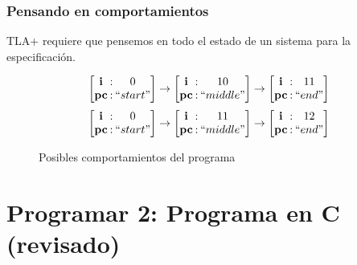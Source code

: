 \documentclass{beamer}
\begin{document}
\begin{frame}[fragile]
  \frametitle{Pensando en comportamientos}

  TLA+ requiere que pensemos en todo el estado de un sistema para la especificación.

  \begin{figure}
    \begin{center}
      \begin{equation*}
        \begingroup
        \setlength\arraycolsep{1pt}
        \begin{aligned}
          \begin{bmatrix*}
            \textbf{i} &:& 0 \\
            \textbf{pc}&:& ``start"
          \end{bmatrix*}
          \rightarrow
          \begin{bmatrix*}
            \textbf{i} &:& 10 \\
            \textbf{pc}&:& ``middle"
          \end{bmatrix*}
          \rightarrow
          \begin{bmatrix*}
            \textbf{i} &:& 11 \\
            \textbf{pc}&:& ``end"
          \end{bmatrix*}
        \end{aligned}
        \endgroup
      \end{equation*}
      \begin{equation*}
        \begingroup
        \setlength\arraycolsep{1pt}
        \begin{aligned}
          \begin{bmatrix*}
            \textbf{i} &:& 0 \\
            \textbf{pc}&:& ``start"
          \end{bmatrix*}
          \rightarrow
          \begin{bmatrix*}
            \textbf{i} &:& 11 \\
            \textbf{pc}&:& ``middle"
          \end{bmatrix*}
          \rightarrow
          \begin{bmatrix*}
            \textbf{i} &:& 12 \\
            \textbf{pc}&:& ``end"
          \end{bmatrix*}
        \end{aligned}
        \endgroup
      \end{equation*}
    \end{center}

    \caption{Posibles comportamientos del programa}
    \label{lst:cprogram_behavior_good}
  \end{figure}

\end{frame}

\section{Programar 2: Programa en C (revisado)}
\end{document}
